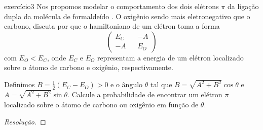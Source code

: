 \begin{exercício}{}{exercício3}
    Nos propomos modelar o comportamento dos dois elétrons \(\pi\) da ligação dupla da molécula de formaldeído . O oxigênio sendo mais eletronegativo que o carbono, discuta por que o hamiltoniano de um elétron toma a forma
    \begin{equation*}
        \begin{pmatrix}
            E_C && -A\\
            -A &&E_O
        \end{pmatrix}
    \end{equation*}
    com \(E_O < E_C\), onde \(E_C\) e \(E_O\) representam a energia de um elétron localizado sobre o átomo de carbono e oxigênio, respectivamente.

    Definimos \(B = \frac12 (E_C - E_O) > 0\) e o ângulo \(\theta\) tal que \(B = \sqrt{A^2 + B^2}\cos\theta\) e \(A = \sqrt{A^2 + B^2}\sin\theta\). Calcule a probabilidade de encontrar um elétron \(\pi\) localizado sobre o átomo de carbono ou oxigênio em função de \(\theta\).
\end{exercício}
\begin{proof}[Resolução]

\end{proof}
